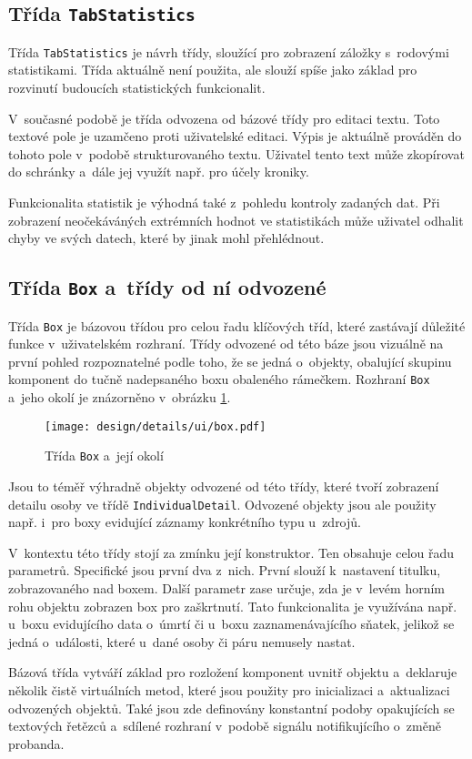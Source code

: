 		\subsection*{Třída \texttt{TabStatistics}}
		Třída \texttt{TabStatistics} je návrh třídy, sloužící pro zobrazení záložky s~rodovými statistikami. Třída aktuálně není použita, ale slouží spíše jako základ pro rozvinutí budoucích statistických funkcionalit.\par
		V~současné podobě je třída odvozena od bázové třídy pro editaci textu. Toto textové pole je uzamčeno proti uživatelské editaci. Výpis je aktuálně prováděn do tohoto pole v~podobě strukturovaného textu. Uživatel tento text může zkopírovat do schránky a~dále jej využít např. pro účely kroniky.\par
		Funkcionalita statistik je výhodná také z~pohledu kontroly zadaných dat. Při zobrazení neočekáváných extrémních hodnot ve statistikách může uživatel odhalit chyby ve svých datech, které by jinak mohl přehlédnout.\par
		
		\subsection*{Třída \texttt{Box} a~třídy od ní odvozené}
		Třída \texttt{Box} je bázovou třídou pro celou řadu klíčových tříd, které zastávají důležité funkce v~uživatelském rozhraní. Třídy odvozené od této báze jsou vizuálně na první pohled rozpoznatelné podle toho, že se jedná o~objekty, obalující skupinu komponent do tučně nadepsaného boxu obaleného rámečkem. Rozhraní \texttt{Box} a~jeho okolí je znázorněno v~obrázku \ref{fig:designDetailBox}. \par
		\begin{figure}[h]
			\centering
			\texttt{[image: design/details/ui/box.pdf]}
			\caption{Třída \texttt{Box} a~její okolí}
			\label{fig:designDetailBox}
		\end{figure}
		Jsou to téměř výhradně objekty odvozené od této třídy, které tvoří zobrazení detailu osoby ve třídě \texttt{IndividualDetail}. Odvozené objekty jsou ale použity např. i~pro boxy evidující záznamy konkrétního typu u~zdrojů.\par
		V~kontextu této třídy stojí za zmínku její konstruktor. Ten obsahuje celou řadu parametrů. Specifické jsou první dva z~nich. První slouží k~nastavení titulku, zobrazovaného nad boxem. Další parametr zase určuje, zda je v~levém horním rohu objektu zobrazen box pro zaškrtnutí. Tato funkcionalita je využívána např. u~boxu evidujícího data o~úmrtí či u~boxu zaznamenávajícího sňatek, jelikož se jedná o~události, které u~dané osoby či páru nemusely nastat.\par
		Bázová třída vytváří základ pro rozložení komponent uvnitř objektu a~deklaruje několik čistě virtuálních metod, které jsou použity pro inicializaci a~aktualizaci odvozených objektů. Také jsou zde definovány konstantní podoby opakujících se textových řetězců a~sdílené rozhraní v~podobě signálu notifikujícího o~změně probanda.\par
		
